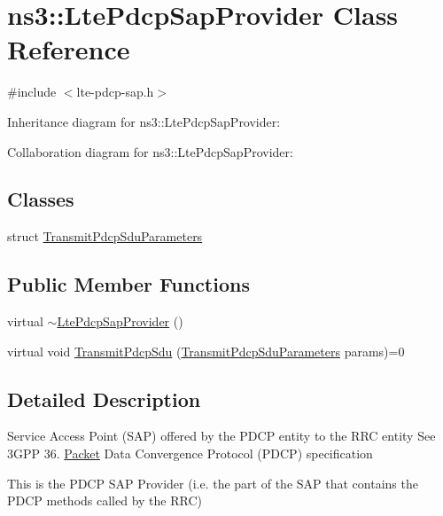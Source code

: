 \hypertarget{classns3_1_1LtePdcpSapProvider}{}\section{ns3\+:\+:Lte\+Pdcp\+Sap\+Provider Class Reference}
\label{classns3_1_1LtePdcpSapProvider}


{\ttfamily \#include $<$lte-\/pdcp-\/sap.\+h$>$}



Inheritance diagram for ns3\+:\+:Lte\+Pdcp\+Sap\+Provider\+:


Collaboration diagram for ns3\+:\+:Lte\+Pdcp\+Sap\+Provider\+:
\subsection*{Classes}
\begin{DoxyCompactItemize}
\item 
struct \hyperlink{structns3_1_1LtePdcpSapProvider_1_1TransmitPdcpSduParameters}{Transmit\+Pdcp\+Sdu\+Parameters}
\end{DoxyCompactItemize}
\subsection*{Public Member Functions}
\begin{DoxyCompactItemize}
\item 
virtual \hyperlink{classns3_1_1LtePdcpSapProvider_adac84a5c8363de216e52deac92c83e8b}{$\sim$\+Lte\+Pdcp\+Sap\+Provider} ()
\item 
virtual void \hyperlink{classns3_1_1LtePdcpSapProvider_a3e9dd77bd2d09935fda263d1583f55f3}{Transmit\+Pdcp\+Sdu} (\hyperlink{structns3_1_1LtePdcpSapProvider_1_1TransmitPdcpSduParameters}{Transmit\+Pdcp\+Sdu\+Parameters} params)=0
\end{DoxyCompactItemize}


\subsection{Detailed Description}
Service Access Point (S\+AP) offered by the P\+D\+CP entity to the R\+RC entity See 3\+G\+PP 36. \hyperlink{classns3_1_1Packet}{Packet} Data Convergence Protocol (P\+D\+CP) specification

This is the P\+D\+CP S\+AP Provider (i.\+e. the part of the S\+AP that contains the P\+D\+CP methods called by the R\+RC) 

